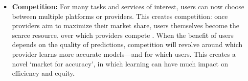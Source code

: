 \begin{itemize}[leftmargin=1em,topsep=0em,itemsep=0.2em]

\item
\textbf{Competition:}
For many tasks and services of interest, users can now choose between multiple platforms or providers.
This creates competition:
once providers aim to maximize their market share,
users themselves become the scarce resource,
over which providers compete \citep{ben2019regression,jagadeesan2023competition,yao2023bad,yao2024user}.
When the benefit of users depends on the quality of predictions,
competition will revolve around which provider learns more accurate models---and for which users.
This creates a novel `market for accuracy',
in which learning can have much impact on efficiency and equity.%




\squeeze

\end{itemize}

 
 


